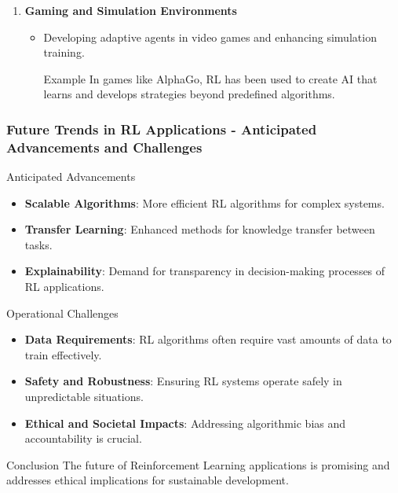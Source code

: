 \documentclass[aspectratio=169]{beamer}
\begin{document}
\begin{frame}[fragile]
\begin{enumerate}
        \item \textbf{Gaming and Simulation Environments}
            \begin{itemize}
                \item Developing adaptive agents in video games and enhancing simulation training.
                \begin{block}{Example}
                    In games like AlphaGo, RL has been used to create AI that learns and develops strategies beyond predefined algorithms.
                \end{block}
            \end{itemize}
    \end{enumerate}
\end{frame}

\begin{frame}[fragile]
    \frametitle{Future Trends in RL Applications - Anticipated Advancements and Challenges}
    \begin{block}{Anticipated Advancements}
        \begin{itemize}
            \item \textbf{Scalable Algorithms}: More efficient RL algorithms for complex systems.
            \item \textbf{Transfer Learning}: Enhanced methods for knowledge transfer between tasks.
            \item \textbf{Explainability}: Demand for transparency in decision-making processes of RL applications.
        \end{itemize}
    \end{block}
    
    \begin{block}{Operational Challenges}
        \begin{itemize}
            \item \textbf{Data Requirements}: RL algorithms often require vast amounts of data to train effectively.
            \item \textbf{Safety and Robustness}: Ensuring RL systems operate safely in unpredictable situations.
            \item \textbf{Ethical and Societal Impacts}: Addressing algorithmic bias and accountability is crucial.
        \end{itemize}
    \end{block}
    
    \begin{block}{Conclusion}
        The future of Reinforcement Learning applications is promising and addresses ethical implications for sustainable development.
    \end{block}
    

\end{frame}
\end{document}
